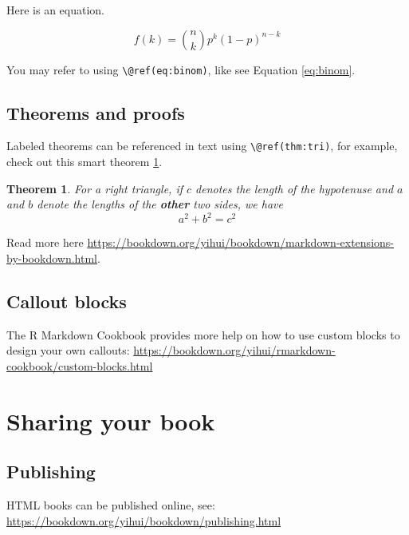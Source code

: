 \documentclass[
]{book}
\newtheorem{theorem}{Theorem}[chapter]
\theoremstyle{definition}
\theoremstyle{definition}
\theoremstyle{definition}
\theoremstyle{definition}
\theoremstyle{remark}
\begin{document}
Here is an equation.

\begin{equation} 
  f\left(k\right) = \binom{n}{k} p^k\left(1-p\right)^{n-k}
  \label{eq:binom}
\end{equation}

You may refer to using \texttt{\textbackslash{}@ref(eq:binom)}, like see Equation \eqref{eq:binom}.

\hypertarget{theorems-and-proofs}{%
\section{Theorems and proofs}\label{theorems-and-proofs}}

Labeled theorems can be referenced in text using \texttt{\textbackslash{}@ref(thm:tri)}, for example, check out this smart theorem \ref{thm:tri}.

\begin{theorem}
\protect\hypertarget{thm:tri}{}\label{thm:tri}For a right triangle, if \(c\) denotes the \emph{length} of the hypotenuse
and \(a\) and \(b\) denote the lengths of the \textbf{other} two sides, we have
\[a^2 + b^2 = c^2\]
\end{theorem}

Read more here \url{https://bookdown.org/yihui/bookdown/markdown-extensions-by-bookdown.html}.

\hypertarget{callout-blocks}{%
\section{Callout blocks}\label{callout-blocks}}

The R Markdown Cookbook provides more help on how to use custom blocks to design your own callouts: \url{https://bookdown.org/yihui/rmarkdown-cookbook/custom-blocks.html}

\hypertarget{sharing-your-book}{%
\chapter{Sharing your book}\label{sharing-your-book}}

\hypertarget{publishing}{%
\section{Publishing}\label{publishing}}

HTML books can be published online, see: \url{https://bookdown.org/yihui/bookdown/publishing.html}
\end{document}
